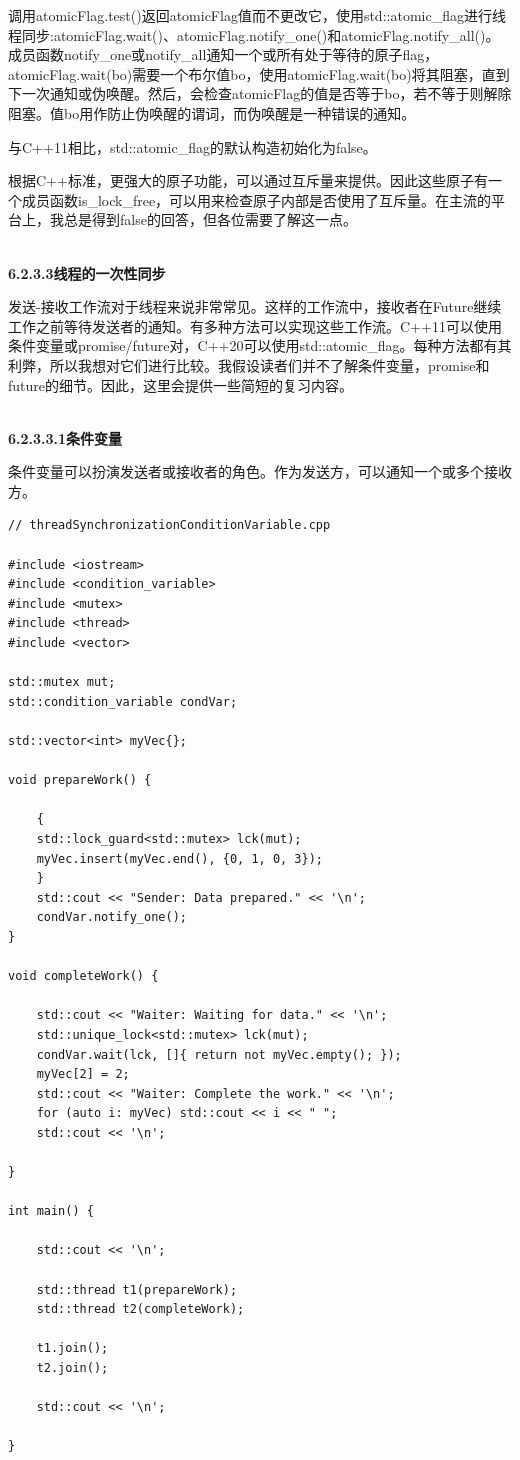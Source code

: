 调用atomicFlag.test()返回atomicFlag值而不更改它，使用std::atomic\_flag进行线程同步:atomicFlag.wait()、atomicFlag.notify\_one()和atomicFlag.notify\_all()。成员函数notify\_one或notify\_all通知一个或所有处于等待的原子flag，atomicFlag.wait(bo)需要一个布尔值bo，使用atomicFlag.wait(bo)将其阻塞，直到下一次通知或伪唤醒。然后，会检查atomicFlag的值是否等于bo，若不等于则解除阻塞。值bo用作防止伪唤醒的谓词，而伪唤醒是一种错误的通知。

与C++11相比，std::atomic\_flag的默认构造初始化为false。

根据C++标准，更强大的原子功能，可以通过互斥量来提供。因此这些原子有一个成员函数is\_lock\_free，可以用来检查原子内部是否使用了互斥量。在主流的平台上，我总是得到false的回答，但各位需要了解这一点。


\hspace*{\fill} \\ %
\noindent
\textbf{6.2.3.3\hspace{0.2cm}线程的一次性同步}

发送-接收工作流对于线程来说非常常见。这样的工作流中，接收者在Future继续工作之前等待发送者的通知。有多种方法可以实现这些工作流。C++11可以使用条件变量或promise/future对，C++20可以使用std::atomic\_flag。每种方法都有其利弊，所以我想对它们进行比较。我假设读者们并不了解条件变量，promise和future的细节。因此，这里会提供一些简短的复习内容。

\hspace*{\fill} \\ %
\noindent
\textbf{6.2.3.3.1\hspace{0.2cm}条件变量}

条件变量可以扮演发送者或接收者的角色。作为发送方，可以通知一个或多个接收方。

\begin{lstlisting}[style=styleCXX]
// threadSynchronizationConditionVariable.cpp

#include <iostream>
#include <condition_variable>
#include <mutex>
#include <thread>
#include <vector>

std::mutex mut;
std::condition_variable condVar;

std::vector<int> myVec{};

void prepareWork() {

	{
	std::lock_guard<std::mutex> lck(mut);
	myVec.insert(myVec.end(), {0, 1, 0, 3});
	}
	std::cout << "Sender: Data prepared." << '\n';
	condVar.notify_one();
}

void completeWork() {

	std::cout << "Waiter: Waiting for data." << '\n';
	std::unique_lock<std::mutex> lck(mut);
	condVar.wait(lck, []{ return not myVec.empty(); });
	myVec[2] = 2;
	std::cout << "Waiter: Complete the work." << '\n';
	for (auto i: myVec) std::cout << i << " ";
	std::cout << '\n';

}

int main() {

	std::cout << '\n';
	
	std::thread t1(prepareWork);
	std::thread t2(completeWork);
	
	t1.join();
	t2.join();
	
	std::cout << '\n';

}
\end{lstlisting}

